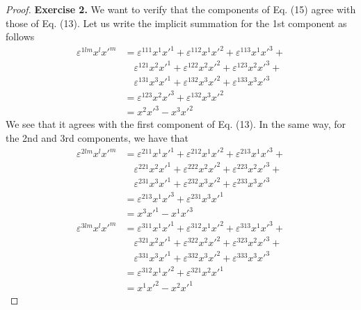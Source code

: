 \documentclass[11pt]{article}
\theoremstyle{definition}
\begin{document}
\begin{proof}{\textbf{Exercise 2.}}
    We want to verify that the components of Eq. (15) agree
    with those of Eq. (13).
    Let us write the implicit summation for the 1st component as follows
    \begin{align*}
        \varepsilon^{1lm}x^lx'^m &=
        \varepsilon^{111}x^1x'^1 + \varepsilon^{112}x^1x'^2
        + \varepsilon^{113}x^1x'^3 + \\
        &\quad\varepsilon^{121}x^2x'^1 + \varepsilon^{122}x^2x'^2
        + \varepsilon^{123}x^2x'^3 +\\
        &\quad\varepsilon^{131}x^3x'^1 + \varepsilon^{132}x^3x'^2
        + \varepsilon^{133}x^3x'^3\\
        &= \varepsilon^{123}x^2x'^3 + \varepsilon^{132}x^3x'^2\\
        &= x^2x'^3 - x^3x'^2
    \end{align*}
    We see that it agrees with the first component of Eq. (13).
    In the same way, for the 2nd and 3rd components, we have that
    \begin{align*}
        \varepsilon^{2lm}x^lx'^m &=
        \varepsilon^{211}x^1x'^1 + \varepsilon^{212}x^1x'^2
        + \varepsilon^{213}x^1x'^3 + \\
        &\quad\varepsilon^{221}x^2x'^1 + \varepsilon^{222}x^2x'^2
        + \varepsilon^{223}x^2x'^3 +\\
        &\quad\varepsilon^{231}x^3x'^1 + \varepsilon^{232}x^3x'^2
        + \varepsilon^{233}x^3x'^3\\
        &= \varepsilon^{213}x^1x'^3 + \varepsilon^{231}x^3x'^1\\
        &= x^3x'^1 - x^1x'^3\\
        \varepsilon^{3lm}x^lx'^m &=
        \varepsilon^{311}x^1x'^1 + \varepsilon^{312}x^1x'^2
        + \varepsilon^{313}x^1x'^3 + \\
        &\quad\varepsilon^{321}x^2x'^1 + \varepsilon^{322}x^2x'^2
        + \varepsilon^{323}x^2x'^3 +\\
        &\quad\varepsilon^{331}x^3x'^1 + \varepsilon^{332}x^3x'^2
        + \varepsilon^{333}x^3x'^3\\
        &= \varepsilon^{312}x^1x'^2 + \varepsilon^{321}x^2x'^1\\
        &= x^1x'^2 - x^2x'^1
    \end{align*}
\end{proof}
\end{document}
